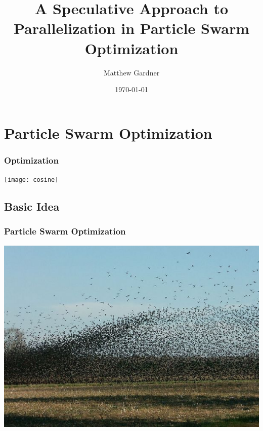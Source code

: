 \documentclass{beamer}
\title[A Speculative Approach to Parallelization in PSO]{A Speculative Approach
to Parallelization in Particle Swarm Optimization}
\author{Matthew Gardner}
\date{\today}
\begin{document}
\begin{frame}
  \titlepage
\end{frame}

\section{Particle Swarm Optimization}
\begin{frame}
  \frametitle{Optimization}
  \texttt{[image: cosine]}
\end{frame}

\subsection{Basic Idea}
\begin{frame}
  \frametitle{Particle Swarm Optimization}
  \includegraphics[width=\textwidth]{birds}
\end{frame}
\end{document}
